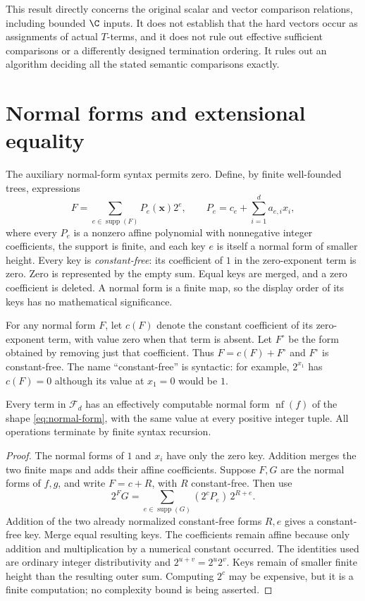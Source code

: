\documentclass[11pt]{article}
\begin{document}
This result directly concerns the original scalar and vector comparison
relations, including bounded $\C$ inputs. It does not establish that the
hard vectors occur as assignments of actual $T$-terms, and it does not
rule out effective sufficient comparisons or a differently designed
termination ordering. It rules out an algorithm deciding all the stated
semantic comparisons exactly.

\section{Normal forms and extensional equality}
The auxiliary normal-form syntax permits zero.  Define, by finite
well-founded trees, expressions
\[
             F=\sum_{e\in\operatorname{supp}(F)}P_e(\mathbf x)2^e,
             \qquad P_e=c_e+\sum_{i=1}^d a_{e,i}x_i,
             \tag{N1}\label{eq:normal-form}
\]
where every $P_e$ is a nonzero affine polynomial with nonnegative integer
coefficients, the support is finite, and each key $e$ is itself a normal
form of smaller height.  Every key is \emph{constant-free}: its
coefficient of $1$ in the zero-exponent term is zero.  Zero is represented
by the empty sum.  Equal keys are merged, and a zero coefficient is
deleted.  A normal form is a finite map, so the display order of its keys
has no mathematical significance.

For any normal form $F$, let $c(F)$ denote the constant coefficient of
its zero-exponent term, with value zero when that term is absent.  Let
$F^{\circ}$ be the form obtained by removing just that coefficient.
Thus $F=c(F)+F^{\circ}$ and $F^{\circ}$ is constant-free.  The name
``constant-free'' is syntactic: for example, $2^{x_1}$ has $c(F)=0$
although its value at $x_1=0$ would be $1$.

\begin{lemma}\label{lem:normalization}
Every term in $\mathcal F_d$ has an effectively computable normal form
$\operatorname{nf}(f)$ of the shape \eqref{eq:normal-form}, with the same value
at every positive integer tuple.  All operations terminate by finite
syntax recursion.
\end{lemma}
\begin{proof}
The normal forms of $1$ and $x_i$ have only the zero key.  Addition merges
the two finite maps and adds their affine coefficients.  Suppose $F,G$
are the normal forms of $f,g$, and write $F=c+R$, with $R$ constant-free.
Then use
\[
     2^F G
       =\sum_{e\in\operatorname{supp}(G)}
             (2^cP_e)\,2^{R+e}.                         \tag{N2}
\]
Addition of the two already normalized constant-free forms $R,e$ gives
a constant-free key.  Merge equal resulting keys.  The coefficients
remain affine because only addition and multiplication by a numerical
constant occurred.  The identities used are ordinary integer
distributivity and $2^{u+v}=2^u2^v$.  Keys remain of smaller finite height
than the resulting outer sum.  Computing $2^c$ may be expensive, but it
is a finite computation; no complexity bound is being asserted.
\end{proof}
\end{document}
